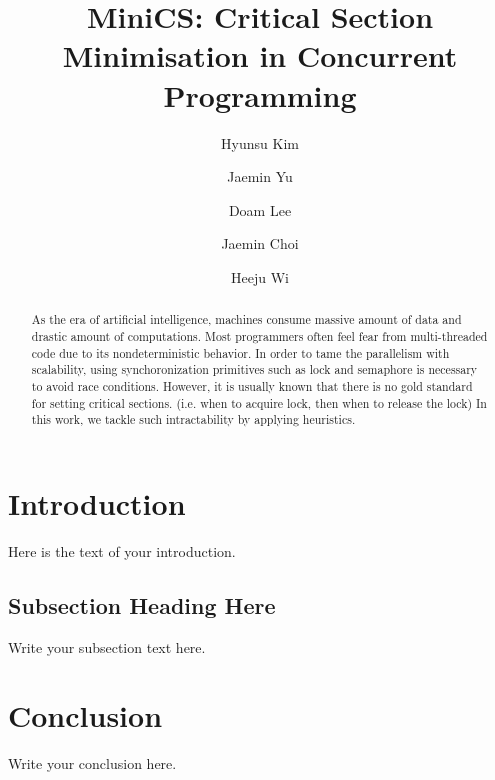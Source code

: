 \documentclass[sigchi]{acmart}
\begin{document}
\title{MiniCS: Critical Section Minimisation in Concurrent Programming}
\author{Hyunsu Kim}

\author{Jaemin Yu}

\author{Doam Lee}

\author{Jaemin Choi}

\author{Heeju Wi}

\begin{abstract}
As the era of artificial intelligence, machines consume massive amount of data and drastic amount of computations. Most programmers often feel fear from multi-threaded code due to its nondeterministic behavior. In order to tame the parallelism with scalability, using synchoronization primitives such as lock and semaphore is necessary to avoid race conditions. However, it is usually known that there is no gold standard for setting critical sections. (i.e. when to acquire lock, then when to release the lock) In this work, we tackle such intractability by applying heuristics.
\end{abstract}

\maketitle

\section{Introduction}
Here is the text of your introduction.

\subsection{Subsection Heading Here}
Write your subsection text here.

\section{Conclusion}
Write your conclusion here.
\end{document}
